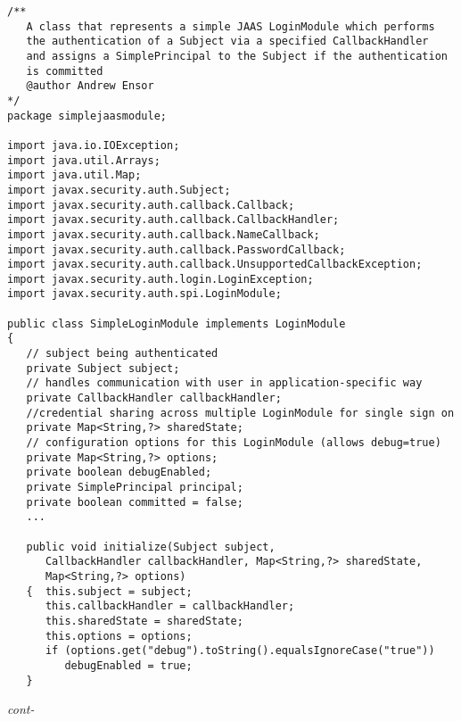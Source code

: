 \begin{figure*}\begin{program}\begin{verbatim}
/**
   A class that represents a simple JAAS LoginModule which performs
   the authentication of a Subject via a specified CallbackHandler
   and assigns a SimplePrincipal to the Subject if the authentication
   is committed
   @author Andrew Ensor
*/
package simplejaasmodule;

import java.io.IOException;
import java.util.Arrays;
import java.util.Map;
import javax.security.auth.Subject;
import javax.security.auth.callback.Callback;
import javax.security.auth.callback.CallbackHandler;
import javax.security.auth.callback.NameCallback;
import javax.security.auth.callback.PasswordCallback;
import javax.security.auth.callback.UnsupportedCallbackException;
import javax.security.auth.login.LoginException;
import javax.security.auth.spi.LoginModule;

public class SimpleLoginModule implements LoginModule
{
   // subject being authenticated
   private Subject subject;
   // handles communication with user in application-specific way
   private CallbackHandler callbackHandler;
   //credential sharing across multiple LoginModule for single sign on
   private Map<String,?> sharedState;
   // configuration options for this LoginModule (allows debug=true)
   private Map<String,?> options;
   private boolean debugEnabled;
   private SimplePrincipal principal;
   private boolean committed = false;
   ...

   public void initialize(Subject subject,
      CallbackHandler callbackHandler, Map<String,?> sharedState,
      Map<String,?> options)
   {  this.subject = subject;
      this.callbackHandler = callbackHandler;
      this.sharedState = sharedState;
      this.options = options;
      if (options.get("debug").toString().equalsIgnoreCase("true"))
         debugEnabled = true;
   }
\end{verbatim}\hfill \emph{cont-}\end{program}\end{figure*}%
